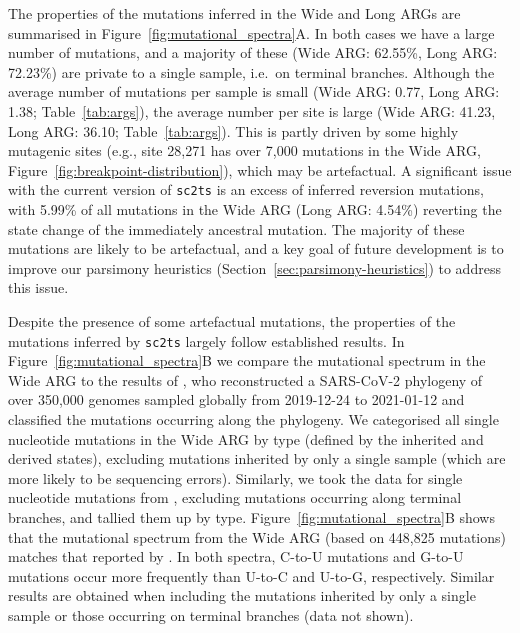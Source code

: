 \documentclass{article}
\begin{document}
The properties of the mutations inferred in the Wide and Long
ARGs are summarised in Figure~\ref{fig:mutational_spectra}A. In both
cases we have a large number of mutations, and a majority of these
(Wide ARG: 62.55\%, Long ARG: 72.23\%) are private to a single
sample, i.e.\ on terminal branches.
Although the average number
of mutations per sample is small
(Wide ARG: 0.77, Long ARG: 1.38; Table~\ref{tab:args}), the average number per site
is large (Wide ARG: 41.23, Long ARG: 36.10; Table~\ref{tab:args}). This is
partly driven by some highly mutagenic sites (e.g., site 28,271 has over 7,000
mutations in the Wide ARG, Figure~\ref{fig:breakpoint-distribution}), which
may be artefactual.
A significant issue with the current version of \texttt{sc2ts} is an excess
of inferred reversion mutations, with 5.99\% of all mutations in the Wide
ARG (Long ARG: 4.54\%) reverting the state change of the immediately
ancestral mutation. The majority of these mutations are likely to be
artefactual, and a key goal of future development is to improve
our parsimony heuristics (Section~\ref{sec:parsimony-heuristics}) to
address this issue.

Despite the presence of some artefactual mutations,
the properties of the mutations inferred by \texttt{sc2ts} largely follow
established results.
In Figure~\ref{fig:mutational_spectra}B we compare the mutational spectrum
in the Wide ARG to the results of \cite{Yi2021-sc},
who reconstructed a SARS-CoV-2 phylogeny of
over 350,000 genomes sampled globally from 2019-12-24 to 2021-01-12
and classified the mutations occurring along the phylogeny.
We categorised all single nucleotide
mutations in the Wide ARG by type (defined by the inherited and derived states),
excluding mutations inherited by only a single sample (which are
more likely to be sequencing errors).
Similarly, we took the data for single nucleotide mutations from
\citet[][\url{https://github.com/ju-lab/SC2_evol_signature}]{Yi2021-sc}, excluding
mutations occurring along terminal branches, and tallied them up by type.
Figure~\ref{fig:mutational_spectra}B shows that the mutational spectrum from the
Wide ARG (based on 448,825 mutations) matches that reported by \citet[based on
92,344 mutations]{Yi2021-sc}. In both spectra, C-to-U mutations and G-to-U
mutations occur more frequently than U-to-C and U-to-G, respectively. Similar
results are obtained when including the mutations inherited by only a single
sample or those occurring on terminal branches (data not shown).
\end{document}
